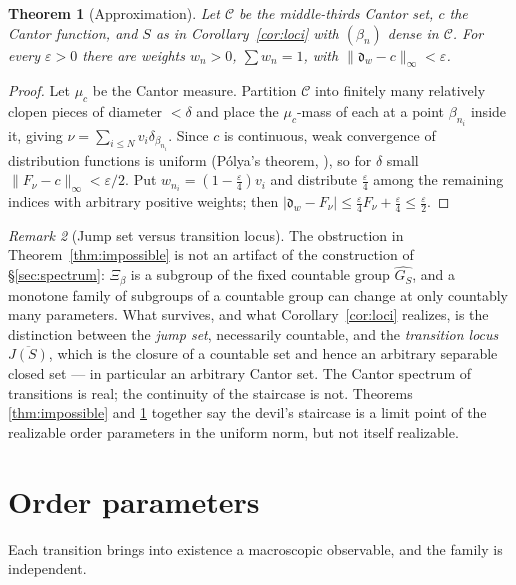 \documentclass[11pt]{amsart}
\numberwithin{equation}{section}
\newtheorem{theorem}{Theorem}[section]
\theoremstyle{definition}
\theoremstyle{remark}
\newtheorem{remark}[theorem]{Remark}
\newcommand{\cC}{\mathcal{C}}
\newcommand{\dw}{\mathfrak{d}}
\begin{document}
\begin{theorem}[Approximation]\label{thm:approx}
Let $\cC$ be the middle-thirds Cantor set, $c$ the Cantor function, and $S$ as in
Corollary~\ref{cor:loci} with $(\beta_n)$ dense in $\cC$. For every $\varepsilon>0$ there
are weights $w_n>0$, $\sum w_n=1$, with $\|\dw_w-c\|_\infty<\varepsilon$.
\end{theorem}

\begin{proof}
Let $\mu_c$ be the Cantor measure. Partition $\cC$ into finitely many relatively clopen
pieces of diameter $<\delta$ and place the $\mu_c$-mass of each at a point $\beta_{n_i}$
inside it, giving $\nu=\sum_{i\le N}v_i\delta_{\beta_{n_i}}$. Since $c$ is continuous, weak
convergence of distribution functions is uniform (P\'olya's theorem, \cite[Problem~14.8]{Billingsley}), so for $\delta$ small
$\|F_\nu-c\|_\infty<\varepsilon/2$. Put $w_{n_i}=(1-\tfrac\varepsilon4)v_i$ and distribute
$\tfrac\varepsilon4$ among the remaining indices with arbitrary positive weights; then
$|\dw_w-F_\nu|\le\tfrac\varepsilon4F_\nu+\tfrac\varepsilon4\le\tfrac\varepsilon2$.
\end{proof}

\begin{remark}[Jump set versus transition locus]\label{rem:whatremains}
The obstruction in Theorem~\ref{thm:impossible} is not an artifact of the construction of
\S\ref{sec:spectrum}: $\Xi_\beta$ is a subgroup of the fixed countable group
$\widehat{G_S}$, and a monotone family of subgroups of a countable group can change at only
countably many parameters. What survives, and what Corollary~\ref{cor:loci} realizes, is the
distinction between the \emph{jump set}, necessarily countable, and the \emph{transition
locus} $\overline{J(S)}$, which is the closure of a countable set and hence an arbitrary
separable closed set --- in particular an arbitrary Cantor set. The Cantor spectrum of
transitions is real; the continuity of the staircase is not. Theorems
\ref{thm:impossible} and \ref{thm:approx} together say the devil's staircase is a limit
point of the realizable order parameters in the uniform norm, but not itself realizable.
\end{remark}

\section{Order parameters}\label{sec:order}

Each transition brings into existence a macroscopic observable, and the family is
independent.
\end{document}
